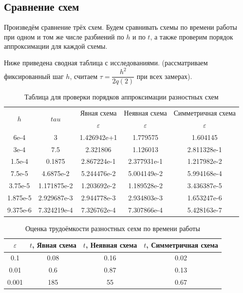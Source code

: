 \documentclass[12pt]{article}
\begin{document}
\subsection{Сравнение схем}
Произведём сравнение трёх схем. Будем сравнивать схемы по времени работы при одном и том же числе разбиений по $h$ и по $t$, а также проверим порядок аппроксимации для каждой схемы.

Ниже приведена сводная таблица с исследованиями. (рассматриваем фиксированный шаг $h$, считаем $\tau = \dfrac{h^2}{2q(2)}$ при всех замерах). 

\begin{table}[H]
\caption{Таблица для проверки порядков аппроксимации разностных схем}
\begin{center}
\begin{tabular}{|c|c|c|c|c|}
\hline
\multirow{2}{*}{$h$} & \multirow{2}{*}{$tau$} & Явная схема & Неявная схема &Симметричная схема  \\
\cline{3-5}
& & $\varepsilon$ & $\varepsilon$ & $\varepsilon$  \\
\hline
6e-4 & 3 & 1.426942e+1 & 1.779575 & 1.604145 \\
\hline
3e-4 & 7.5 & 2.321806 & 1.126013 & 2.811328e-1  \\
\hline
1.5e-4 & 0.1875 & 2.867224e-1 & 2.377931e-1 & 1.217982e-2 \\
\hline
7.5e-5 & 4.6875e-2 & 5.244476e-2 & 5.004149e-2 & 5.994168e-4 \\ 
\hline
3.75e-5 & 1.171875e-2 & 1.203692e-2 & 1.189528e-2 & 3.436387e-5 \\
\hline
1.875e-5 & 2.929687e-3 & 2.944778e-3 & 2.934803e-3 & 1.653247e-6 \\
\hline
9.375e-6 & 7.324219e-4 & 7.326762e-4 & 7.307866e-4 & 5.428163e-7 \\
\hline
\end{tabular}
\end{center}
\end{table}

\begin{table}[H]
\caption{Оценка трудоёмкости разностных сехм по времени работы}
\begin{center}
\begin{tabular}{|c|c|c|c|}
\hline
$\varepsilon$ & $t$, Явная схема & $t$, Неявная схема & $t$, Симметричная схема  \\
\hline
0.1 & 0.08 & 0.16 & 0.02 \\
\hline
0.01 & 0.6 & 0.87 & 0.13\\
\hline
0.001 & 185 & 55 & 0.67\\
\hline
\end{tabular}
\end{center}
\end{table}
\end{document}

